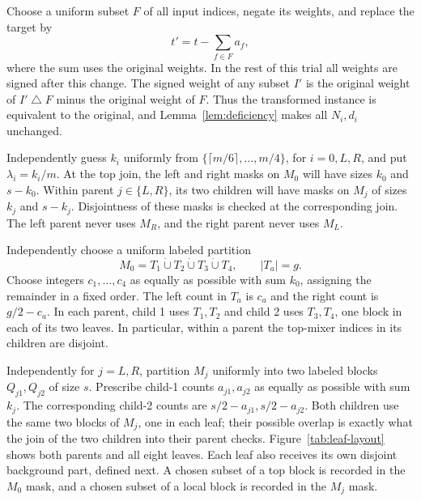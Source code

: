 Choose a uniform subset $F$ of all input indices, negate its weights, and
replace the target by
\begin{equation}\label{alg:sign-flip}
  t'=t-\sum_{f\in F}a_f,
\end{equation}
where the sum uses the original weights.  In the rest of this trial all
weights are signed after this change.  The signed weight of any subset
$I'$ is the original weight of $I'\mathbin{\triangle}F$ minus the
original weight of $F$.  Thus the transformed instance is equivalent to
the original, and Lemma~\ref{lem:deficiency} makes all $N_i,d_i$
unchanged.

Independently guess $k_i$ uniformly from
$\{\lceil m/6\rceil,\ldots,m/4\}$, for $i=0,L,R$, and put
$\lambda_i=k_i/m$.  At the top join, the left and right masks on $M_0$
will have sizes $k_0$ and $s-k_0$.  Within parent $j\in\{L,R\}$, its
two children will have masks on $M_j$ of sizes $k_j$ and $s-k_j$.
Disjointness of these masks is checked at the corresponding join.  The
left parent never uses $M_R$, and the right parent never uses $M_L$.

Independently choose a uniform labeled partition
\[
 M_0=T_1\mathbin{\dot\cup}T_2\mathbin{\dot\cup}T_3\mathbin{\dot\cup}T_4,
 \qquad |T_a|=g.
\]
Choose integers $c_1,\ldots,c_4$ as equally
as possible with sum $k_0$, assigning the remainder in a fixed order.
The left count in $T_a$ is $c_a$ and the right count is $g/2-c_a$.
In each parent, child 1 uses $T_1,T_2$ and child 2 uses $T_3,T_4$,
one block in each of its two leaves.  In particular, within a parent the
top-mixer indices in its children are disjoint.

Independently for $j=L,R$, partition $M_j$ uniformly into two labeled
blocks $Q_{j1},Q_{j2}$ of size $s$.  Prescribe child-1 counts
$a_{j1},a_{j2}$ as equally as possible with sum $k_j$.  The corresponding
child-2 counts are $s/2-a_{j1},s/2-a_{j2}$.  Both children use the same
two blocks of $M_j$, one in each leaf; their possible overlap is exactly
what the join of the two children into their parent checks.
Figure~\ref{tab:leaf-layout} shows both parents and all eight leaves.
Each leaf also receives its own disjoint background part, defined next. A chosen subset of a top block is recorded
in the $M_0$ mask, and a chosen subset of a local block is recorded in the
$M_j$ mask.

